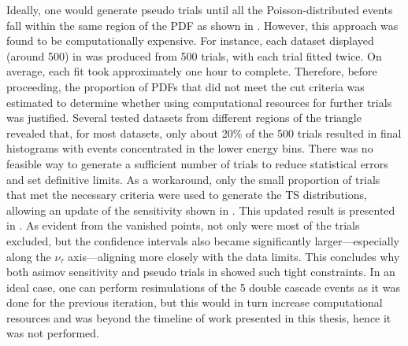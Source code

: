 Ideally, one would generate pseudo trials until all the Poisson-distributed events fall within the same region of the PDF as shown in . However, this approach was found to be computationally expensive. For instance, each dataset displayed (around 500) in  was produced from 500 trials, with each trial fitted twice. On average, each fit took approximately one hour to complete. Therefore, before proceeding, the proportion of PDFs that did not meet the cut criteria was estimated to determine whether using computational resources for further trials was justified. Several tested datasets from different regions of the triangle revealed that, for most datasets, only about 20\% of the 500 trials resulted in final histograms with events concentrated in the lower energy bins. There was no feasible way to generate a sufficient number of trials to reduce statistical errors and set definitive limits. As a workaround, only the small proportion of trials that met the necessary criteria were used to generate the TS distributions, allowing an update of the sensitivity shown in . This updated result is presented in . As evident from the vanished points, not only were most of the trials excluded, but the confidence intervals also became significantly larger—especially along the $\nu_{\tau}$ axis—aligning more closely with the data limits. This concludes why both asimov sensitivity and pseudo trials in  showed such tight constraints. In an ideal case, one can perform resimulations of the 5 double cascade events as it was done for the previous iteration, but this would in turn increase computational resources and was beyond the timeline of work presented in this thesis, hence it was not performed.


